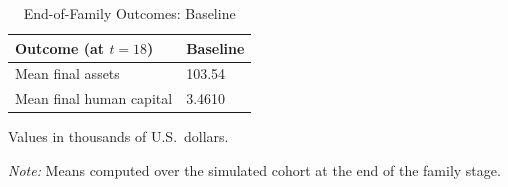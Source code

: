 \begin{table}[H]
    \centering
    \begin{threeparttable}
    \caption{End-of-Family Outcomes: Baseline}
    \label{tab:baseline_outcomes}
    \begin{tabular}{p{5.2cm} p{2.8cm} }
        \toprule\toprule
        \textbf{Outcome (at $t=18$)} & \textbf{Baseline} \\
        \midrule
        Mean final assets\tnote{a} & 103.54 \\
        Mean final human capital & 3.4610 \\
        \bottomrule\bottomrule
    \end{tabular}
    \begin{tablenotes}
        \footnotesize
        \item[a] Values in thousands of U.S.\ dollars.
        \item \textit{Note:} Means computed over the simulated cohort at the end of the family stage.
    \end{tablenotes}
    \end{threeparttable}
\end{table}
